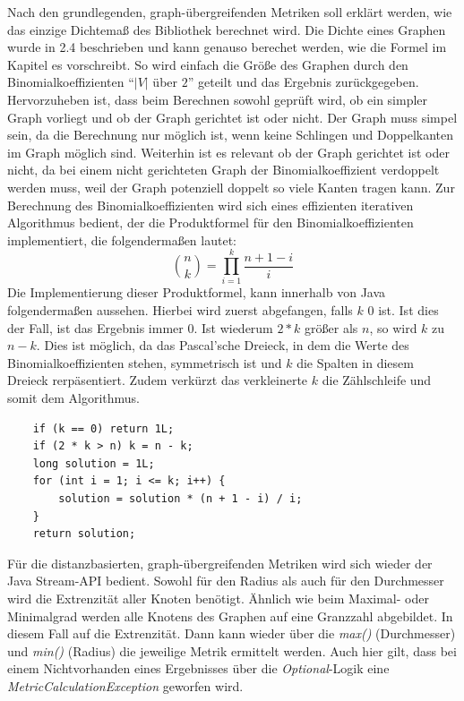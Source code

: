 \documentclass[a4paper,12pt,ngerman,chapterprefix=false,listof=totoc,bibliography=totoc]{scrreprt}
\begin{document}
{{{Nach den grundlegenden, graph-übergreifenden Metriken soll erklärt werden, wie das einzige Dichtemaß des Bibliothek berechnet wird. Die Dichte eines Graphen wurde in 2.4 beschrieben und kann genauso berechet werden, wie die Formel im Kapitel es vorschreibt. So wird einfach die Größe des Graphen durch den Binomialkoeffizienten "`\(|V|\) über \(2\)"' geteilt und das Ergebnis zurückgegeben. Hervorzuheben ist, dass beim Berechnen sowohl geprüft wird, ob ein simpler Graph vorliegt und ob der Graph gerichtet ist oder nicht. Der Graph muss simpel sein, da die Berechnung nur möglich ist, wenn keine Schlingen und Doppelkanten im Graph möglich sind. Weiterhin ist es relevant ob der Graph gerichtet ist oder nicht, da bei einem nicht gerichteten Graph der Binomialkoeffizient verdoppelt werden muss, weil der Graph potenziell doppelt so viele Kanten tragen kann. Zur Berechnung des Binomialkoeffizienten wird sich eines effizienten iterativen Algorithmus bedient, der die Produktformel für den Binomialkoeffizienten implementiert, die folgendermaßen lautet:
\[
	\binom{n}{k}=\prod_{i=1}^{k}\frac{n+1-i}{i}
\]
Die Implementierung dieser Produktformel, kann innerhalb von Java folgendermaßen aussehen. Hierbei wird zuerst abgefangen, falls \(k\) 0 ist. Ist dies der Fall, ist das Ergebnis immer 0. Ist wiederum \(2 * k\) größer als \(n\), so wird \(k\) zu \(n - k\). Dies ist möglich, da das Pascal'sche Dreieck, in dem die Werte des Binomialkoeffizienten stehen, symmetrisch ist und \(k\) die Spalten in diesem Dreieck rerpäsentiert. Zudem verkürzt das verkleinerte \(k\) die Zählschleife und somit dem Algorithmus.
\begin{lstlisting}
	if (k == 0) return 1L;
	if (2 * k > n) k = n - k;
	long solution = 1L;
	for (int i = 1; i <= k; i++) {
		solution = solution * (n + 1 - i) / i;
	}
	return solution;
\end{lstlisting}
Für die distanzbasierten, graph-übergreifenden Metriken wird sich wieder der Java Stream-API bedient. Sowohl für den Radius als auch für den Durchmesser wird die Extrenzität aller Knoten benötigt. Ähnlich wie beim Maximal- oder Minimalgrad werden alle Knotens des Graphen auf eine Granzzahl abgebildet. In diesem Fall auf die Extrenzität. Dann kann wieder über die \textit{max()} (Durchmesser) und \textit{min()} (Radius) die jeweilige Metrik ermittelt werden. Auch hier gilt, dass bei einem Nichtvorhanden eines Ergebnisses über die \textit{Optional}-Logik eine \textit{MetricCalculationException} geworfen wird.

}}}
\end{document}
